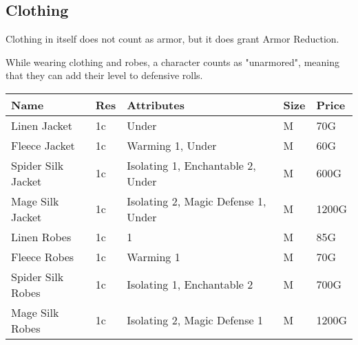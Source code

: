 \onecolumn
\subsection{Clothing}

Clothing in itself does not count as armor, but it does grant Armor Reduction.

While wearing clothing and robes, a character counts as "unarmored", meaning that they can add their level to defensive rolls.

\begin{longtable}{p{3cm} | p{1.5cm} | p{5cm} | p{1cm} | p{1.5cm}}
	Name & Res &   Attributes & Size & Price\\ \hline
	Linen Jacket & 1c & Under & M & 70G\\
	
	Fleece Jacket & 1c & Warming 1, Under & M & 60G\\
	
	Spider Silk Jacket & 1c & Isolating 1, Enchantable 2, Under & M & 600G\\
	
	Mage Silk Jacket & 1c & Isolating 2, Magic Defense 1, Under & M & 1200G\\
	
	Linen Robes & 1c & 1 & M & 85G\\
	
	Fleece Robes & 1c & Warming 1 & M & 70G\\

	Spider Silk Robes & 1c & Isolating 1, Enchantable 2 & M & 700G\\
	
	Mage Silk Robes & 1c & Isolating 2, Magic Defense 1 & M & 1200G\\
\end{longtable}
\twocolumn